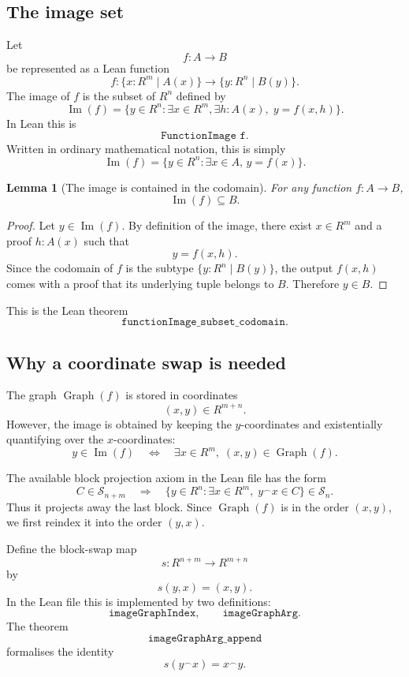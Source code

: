 \documentclass[11pt]{article}
\newtheorem{lemma}[definition]{Lemma}
\newcommand{\Sfam}{\mathcal S}
\newcommand{\Graph}{\operatorname{Graph}}
\newcommand{\Imf}{\operatorname{Im}}
\newcommand{\cat}{\mathbin{{}^\frown}}
\newcommand{\Lean}[1]{\texttt{#1}}
\begin{document}
\subsection{The image set}

Let
\[
  f:A\to B
\]
be represented as a Lean function
\[
  f:
  \{x:R^m\mid A(x)\}
  \longrightarrow
  \{y:R^n\mid B(y)\}.
\]
The image of $f$ is the subset of $R^n$ defined by
\[
  \Imf(f)=\{y\in R^n:\exists x\in R^m,\exists h:A(x),\;y=f(x,h)\}.
\]
In Lean this is
\[
  \Lean{FunctionImage f}.
\]
Written in ordinary mathematical notation, this is simply
\[
  \Imf(f)=\{y\in R^n:\exists x\in A,\, y=f(x)\}.
\]

\begin{lemma}[The image is contained in the codomain]
For any function $f:A\to B$,
\[
  \Imf(f)\subseteq B.
\]
\end{lemma}

\begin{proof}
Let $y\in\Imf(f)$.  By definition of the image, there exist $x\in R^m$ and a proof $h:A(x)$ such
that
\[
  y=f(x,h).
\]
Since the codomain of $f$ is the subtype $\{y:R^n\mid B(y)\}$, the output $f(x,h)$ comes with a proof
that its underlying tuple belongs to $B$.  Therefore $y\in B$.
\end{proof}

This is the Lean theorem
\[
  \Lean{functionImage\_subset\_codomain}.
\]

\subsection{Why a coordinate swap is needed}

The graph $\Graph(f)$ is stored in coordinates
\[
  (x,y)\in R^{m+n}.
\]
However, the image is obtained by keeping the $y$-coordinates and existentially quantifying over the
$x$-coordinates:
\[
  y\in\Imf(f)
  \quad\Longleftrightarrow\quad
  \exists x\in R^m,
  \;(x,y)
  \in\Graph(f).
\]

The available block projection axiom in the Lean file has the form
\[
  C\in\Sfam_{n+m}
  \quad\Longrightarrow\quad
  \{y\in R^n:\exists x\in R^m,\; y\cat x\in C\}
  \in\Sfam_n.
\]
Thus it projects away the last block.  Since $\Graph(f)$ is in the order $(x,y)$, we first reindex it
into the order $(y,x)$.

Define the block-swap map
\[
  s:R^{n+m}\to R^{m+n}
\]
by
\[
  s(y,x)=(x,y).
\]
In the Lean file this is implemented by two definitions:
\[
  \Lean{imageGraphIndex},
  \qquad
  \Lean{imageGraphArg}.
\]
The theorem
\[
  \Lean{imageGraphArg\_append}
\]
formalises the identity
\[
  s(y\cat x)=x\cat y.
\]
\end{document}
